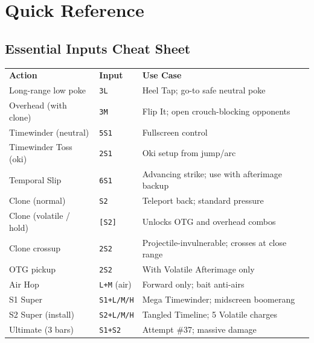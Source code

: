 \documentclass[12pt, a4paper]{report}
\newcommand{\notation}[1]{{\small\texttt{\textcolor{ekkoBlue}{#1}}}}
\begin{document}
\chapter{Quick Reference}

\section{Essential Inputs Cheat Sheet}

\begin{center}
\begin{tabularx}{\linewidth}{L{4.5cm} L{2.5cm} L{6.5cm}}
\textcolor{ekkoBlue}{\textbf{Action}} & \textcolor{ekkoBlue}{\textbf{Input}} & \textcolor{ekkoBlue}{\textbf{Use Case}} \\
Long-range low poke & \notation{3L} & Heel Tap; go-to safe neutral poke \\
Overhead (with clone) & \notation{3M} & Flip It; open crouch-blocking opponents \\
Timewinder (neutral) & \notation{5S1} & Fullscreen control \\
Timewinder Toss (oki) & \notation{2S1} & Oki setup from jump/arc \\
Temporal Slip & \notation{6S1} & Advancing strike; use with afterimage backup \\
Clone (normal) & \notation{S2} & Teleport back; standard pressure \\
Clone (volatile / hold) & \notation{[S2]} & Unlocks OTG and overhead combos \\
Clone crossup & \notation{2S2} & Projectile-invulnerable; crosses at close range \\
OTG pickup & \notation{2S2} & With Volatile Afterimage only \\
Air Hop & \notation{L+M} (air) & Forward only; bait anti-airs \\
S1 Super & \notation{S1+L/M/H} & Mega Timewinder; midscreen boomerang \\
S2 Super (install) & \notation{S2+L/M/H} & Tangled Timeline; 5 Volatile charges \\
Ultimate (3 bars) & \notation{S1+S2} & Attempt \#37; massive damage \\
\end{tabularx}
\end{center}
\end{document}
